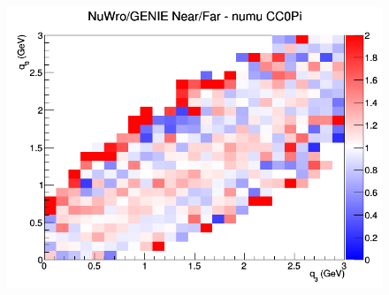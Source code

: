 \documentclass[12pt]{article}
\begin{document}
\begin{figure}[h]
\endminipage
{}
\includegraphics[width=\linewidth]{eff_q0_q3/FGT/ratios/CC0Pi_NuWro_GENIE_numu_NF_q3_q0.png}
\endminipage
\newline
\end{figure}
\clearpage
\end{document}
